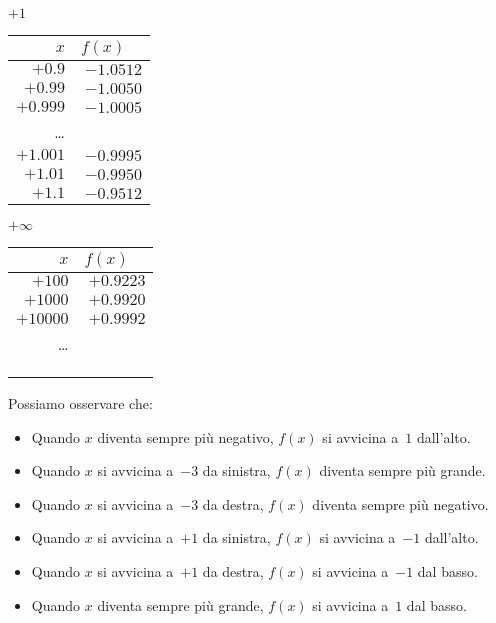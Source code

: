 \begin{esempio}
\begin{minipage}{.24\textwidth}
\begin{center}
\(+1\)\\
\begin{tabular}{r|r}
\(x\) & \(f(x)\quad\)\\\hline
\(+0.9\) & \(-1.0512\)\\
\(+0.99\) & \(-1.0050\) \\
\(+0.999\) & \(-1.0005\) \\
\dots \\
\(+1.001\) & \(-0.9995\) \\
\(+1.01\) & \(-0.9950\) \\
\(+1.1\) & \(-0.9512\) \\
\end{tabular}
\end{center}
\end{minipage}
\begin{minipage}{.24\textwidth}
\begin{center}
\(+\infty\)\\
\begin{tabular}{r|r}
\(x\) & \(f(x)\quad\)\\\hline
\(+100\) & \(+0.9223\) \\
\(+1000\) & \(+0.9920\) \\
\(+10000\) & \(+0.9992\) \\
\dots \\
&\\
&\\
&
\end{tabular}
\end{center}
\end{minipage}
Possiamo osservare che:
\begin{itemize} [nosep]
 \item Quando \(x\) diventa sempre più negativo, 
\(f(x)\) si avvicina a~\(1\) dall'alto.
 \item Quando \(x\) si avvicina a~\(-3\) da sinistra, 
\(f(x)\) diventa sempre più grande.
 \item Quando \(x\) si avvicina a~\(-3\) da destra, 
\(f(x)\) diventa sempre più negativo.
 \item Quando \(x\) si avvicina a~\(+1\) da sinistra, 
\(f(x)\)  si avvicina a~\(-1\) dall'alto.
 \item Quando \(x\) si avvicina a~\(+1\) da destra, 
\(f(x)\)  si avvicina a~\(-1\) dal basso.
 \item Quando \(x\) diventa sempre più grande, 
\(f(x)\) si avvicina a~\(1\) dal basso.
\end{itemize}
\begin{center}\scalebox{.6}{\limitigraficoa}\end{center}
\end{esempio}

